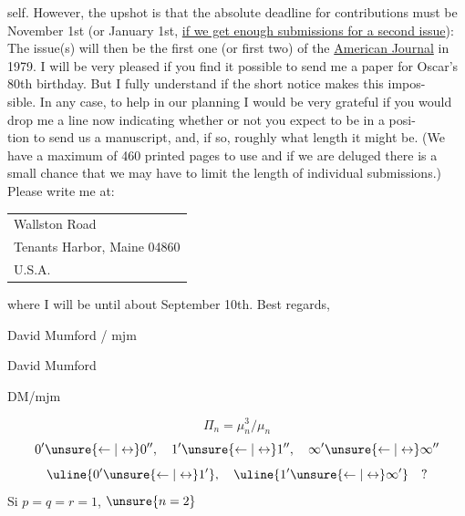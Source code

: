 self. However, the upshot is that the absolute deadline for contributions must be November 1st (or January 1st, \uline{if we get enough submissions for a second issue}): The issue(s) will then be the first one (or first two) of the \uline{American Journal} in 1979.
I will be very pleased if you find it possible to send me a paper for Oscar's 80th birthday. But I fully understand if the short notice makes this impos-\\
sible. In any case, to help in our planning I would be very grateful if you would drop me a line now indicating whether or not you expect to be in a posi-\\
tion to send us a manuscript, and, if so, roughly what length it might be. (We have a maximum of 460 printed pages to use and if we are deluged there is a small chance that we may have to limit the length of individual submissions.) Please write me at:
\begin{tabular}{l}
Wallston Road\\
Tenants Harbor, Maine 04860\\
U.S.A.
\end{tabular}
where I will be until about September 10th.
Best regards,

David Mumford / mjm

David Mumford

DM/mjm

\[\Pi_n=\mu_n^3/\mu_n\]
\[
0'\unsure{\leftarrow|\leftrightarrow}0'',\quad
1'\unsure{\leftarrow|\leftrightarrow}1'',\quad
\infty'\unsure{\leftarrow|\leftrightarrow}\infty''
\]
\[
\uline{0'\unsure{\leftarrow|\leftrightarrow}1'},\quad
\uline{1'\unsure{\leftarrow|\leftrightarrow}\infty'}\quad ?
\]
Si $p=q=r=1$, $\unsure{n=2}$

